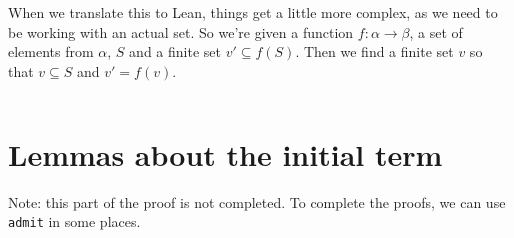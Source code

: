 \documentclass[a4paper, 12pt]{article}
\newcommand{\lean}[1]{\texttt{#1}}
\theoremstyle{changedot}
\theoremstyle{changedotbreak}
\theoremstyle{nonumberplain}
\begin{document}
When we translate this to Lean, things get a little more complex, as we need to be working with an actual set. So we're given a function $f : \alpha \to \beta$, a set of elements from $\alpha$, $S$ and a finite set $v' \subseteq f(S)$. Then we find a finite set $v$ so that $v \subseteq S$ and $v' = f(v)$.

\inputminted[firstline=14, lastline=63]{lean}{../src/dickson.lean}

\section{Lemmas about the initial term}\label{app:IN}
Note: this part of the proof is not completed. To complete the proofs, we can use \lean{admit} in some places.
\inputminted[firstline=55]{lean}{../src/initial_term.lean}
\end{document}
